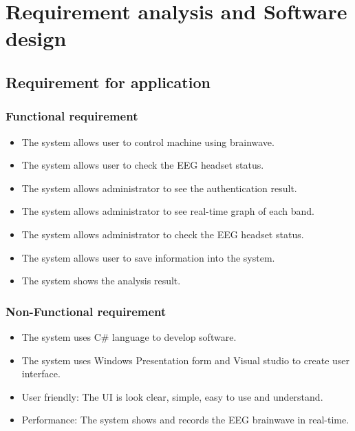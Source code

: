 \chapter{Requirement analysis and Software design}

\label{ch:Requirement analysis and Software design}

\setlength{\parindent}{4em}
\setlength{\parskip}{1em}
\renewcommand{\baselinestretch}{1.5}

\section{Requirement for application}

\subsection{Functional requirement}
\begin{itemize}
	\item The system allows user to control machine using brainwave.
    \item The system allows user to check the EEG headset status.
    \item The system allows administrator to see the authentication result.
    \item The system allows administrator to see real-time graph of each band.
    \item The system allows administrator to check the EEG headset status.
    \item The system allows user to save information into the system.
    \item The system shows the analysis result.
\end{itemize}  

\newpage

\subsection{Non-Functional requirement}
\begin{itemize}
	\item The system uses C\# language to develop software.
    \item The system uses Windows Presentation form and Visual studio to create user interface.
    \item User friendly: The UI is look clear, simple, easy to use and understand.
    \item Performance: The system shows and records the EEG brainwave in real-time.
\end{itemize}

